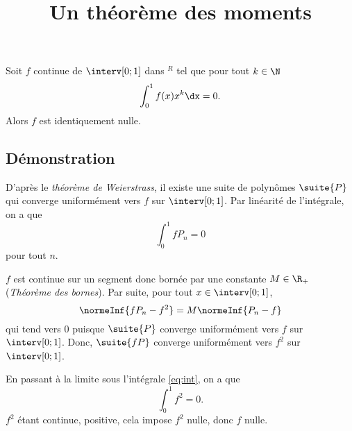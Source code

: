 \documentclass[fontsize=12pt,twoside=false,parskip=half, french]{scrartcl}
\title{Un théorème des moments}
\date{}
\author{}
\begin{document}
\maketitle
   \begin{Theoreme}
      Soit $f$ continue de $\interv[0; 1]$ dans $^R$ tel que pour tout $k \in \N$
      \[
         \int_0^1 f(x)x^k \dx = 0.
      \]
      Alors $f$ est identiquement nulle.
   \end{Theoreme}
   \subsection{Démonstration}
      D’après le \emph{théorème de Weierstrass}, il existe une suite de polynômes $\suite{P}$ qui converge
      uniformément vers $f$ sur $\interv[0; 1]$. Par linéarité de l’intégrale, on a que
      \begin{equation}
         \int_0^1 fP_n = 0 \label{eq:int}
      \end{equation}
      pour tout $n$. 
      
      $f$ est continue sur un segment donc bornée par une constante $M \in \R_+$ (\emph{Théorème des bornes}).
      Par suite, pour tout $x \in  \interv[0; 1]$,
      \[
         \normeInf{fP_n - f^2} = M\normeInf{P_n - f}
      \]
      qui tend vers 0 puisque $\suite{P}$ converge uniformément vers $f$ sur $\interv[0; 1]$. Donc, $\suite{fP}$ converge 
      uniformément vers $f^2$ sur $\interv[0; 1]$.
      
      En passant à la limite sous l’intégrale \eqref{eq:int}, on a que
      \[
         \int_0^1 f^2 = 0.
      \]
      $f^2$ étant continue, positive, cela impose $f^2$ nulle, donc $f$ nulle.
\end{document}
